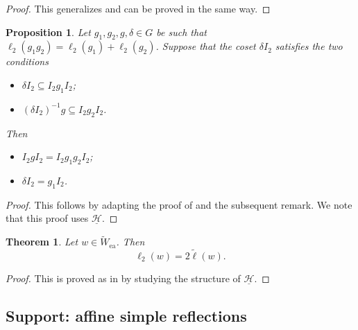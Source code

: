 \documentclass[10pt, letterpaper]{amsart}
\theoremstyle{plain}
\newtheorem{Thm}[equation]{Theorem}
\newtheorem{Prop}[equation]{Proposition}
\theoremstyle{definition}
\numberwithin{equation}{section}
\newcommand{\ea}{\mathrm{ea}}
\newcommand{\Hcal}{\mathcal{H}}
\begin{document}
\begin{proof}
	This generalizes \cite[Lemma 5.4]{Karasiewicz} and can be proved in the same way.
\end{proof}

\begin{Prop}\label{CosetProp}
	Let $g_{1},g_{2},g,\delta\in G$ be such that $\ell_{2}(g_{1}g_{2})=\ell_{2}(g_{1})+\ell_{2}(g_{2})$. Suppose that the coset $\delta I_2$ satisfies the two conditions
	\begin{itemize}
		\item $\delta I_2\subseteq  I_2g_{1} I_2$;
		\item $(\delta I_2)^{-1}g\subseteq  I_2g_{2} I_2$.
	\end{itemize} 
	Then
	\begin{itemize}
		\item $ I_2g I_2=  I_2g_{1}g_{2} I_2$;
		\item $\delta I_2= g_{1} I_2$.
	\end{itemize} 
\end{Prop}

\begin{proof}
	This follows by adapting the proof of \cite[Proposition 5.2]{Karasiewicz} and the subsequent remark. We note that this proof uses $\underline{\Hcal}$.
\end{proof}

\begin{Thm}\label{ProportionalLengths}
	Let $w\in \widetilde{W}_{\ea}$. Then
	\begin{equation*}
		\ell_{2}(w)=2\tilde{\ell}(w).
	\end{equation*}
\end{Thm}

\begin{proof}
	This is proved as in \cite[Theorem 5.5]{Karasiewicz} by studying the structure of $\underline{\Hcal}$.
\end{proof}






\subsection{Support: affine simple reflections}\label{SuppAfSimpRel}

\end{document}
